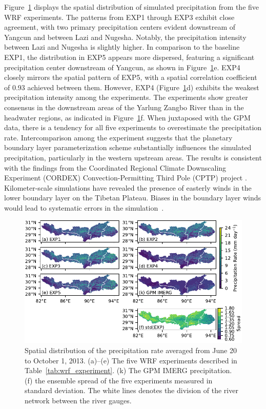 \documentclass[draft]{agujournal2019}
\begin{document}
Figure~\ref{fig:prdist} displays the spatial distribution of simulated precipitation from the five WRF experiments. The patterns from EXP1 through EXP3 exhibit close agreement, with two primary precipitation centers evident downstream of Yangcun and between Lazi and Nugesha. Notably, the precipitation intensity between Lazi and Nugesha is slightly higher. In comparison to the baseline EXP1, the distribution in EXP5 appears more dispersed, featuring a significant precipitation center downstream of Yangcun, as shown in Figure~\ref{fig:prdist}e. EXP4 closely mirrors the spatial pattern of EXP5, with a spatial correlation coefficient of 0.93 achieved between them. However, EXP4 (Figure~\ref{fig:prdist}d) exhibits the weakest precipitation intensity among the experiments. The experiments show greater consensus in the downstream areas of the Yarlung Zangbo River than in the headwater regions, as indicated in Figure~\ref{fig:prdist}f. When juxtaposed with the GPM data, there is a tendency for all five experiments to overestimate the precipitation rate. Intercomparison among the experiment suggests that the planetary boundary layer parameterization scheme substantially influences the simulated precipitation, particularly in the western upstream areas. The results is consistent with the findings from the Coordinated Regional Climate Downscaling Experiment (CORDEX) Convection-Permitting Third Pole (CPTP) project \cite{prein2023CD}. Kilometer-scale simulations have revealed the presence of easterly winds in the lower boundary layer on the Tibetan Plateau. Biases in the boundary layer winds would lead to systematic errors in the simulation~\cite{kukulies2023JC}.

\begin{figure}[h!]
  \centering
  \noindent\includegraphics[width=140mm]{prrn_prdist.pdf}
  \caption{Spatial distribution of the precipitation rate averaged from June 20 to October 1, 2013. (a)--(e) The five WRF experiments described in Table~\ref{tab:wrf_experiment}. (k) The GPM IMERG precipitation. (f) the ensemble spread of the five experiments measured in standard deviation. The white lines denotes the division of the river network between the river gauges.}\label{fig:prdist}
\end{figure}
\end{document}
